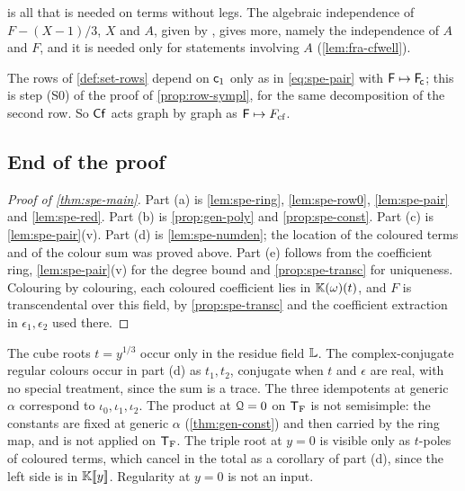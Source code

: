  is all that is needed on terms without legs. The algebraic independence of $F-(X-1)/3$, $X$ and $A$, given by \cite[Lemma~4.2]{BFGW21}, gives more, namely the independence of $A$ and $F$, and it is needed only for statements involving $A$ (\cref{lem:fra-cfwell}).

\begin{rmk}
\label{rmk:spe-cfgraph}
The rows of \cref{def:set-rows} depend on $\mathsf{c}_{1}$ only as in \eqref{eq:spe-pair} with $\mathsf{F}\mapsto\mathsf{F}_{\!\mathsf{c}}$; this is step (S0) of the proof of \cref{prop:row-sympl}, for the same decomposition of the second row. So $\mathsf{Cf}$ acts graph by graph as $\mathsf{F}\mapsto F_{\mathrm{cf}}$.
\end{rmk}

\subsection{End of the proof}

\begin{proof}[Proof of \cref{thm:spe-main}]
Part (a) is \cref{lem:spe-ring}, \cref{lem:spe-row0}, \cref{lem:spe-pair} and \cref{lem:spe-red}. Part (b) is \cref{prop:gen-poly} and \cref{prop:spe-const}. Part (c) is \cref{lem:spe-pair}(v). Part (d) is \cref{lem:spe-numden}; the location of the coloured terms and of the colour sum was proved above. Part (e) follows from the coefficient ring, \cref{lem:spe-pair}(v) for the degree bound and \cref{prop:spe-transc} for uniqueness. Colouring by colouring, each coloured coefficient lies in $\mathbb{K}(\omega)(t)$, and $F$ is transcendental over this field, by \cref{prop:spe-transc} and the coefficient extraction in $\epsilon_1,\epsilon_2$ used there.
\end{proof}

\begin{rmk}
\label{rmk:spe-rank3}
The cube roots $t=y^{1/3}$ occur only in the residue field $\mathbb{L}$. The complex-conjugate regular colours occur in part (d) as $t_1,t_2$, conjugate when $t$ and $\epsilon$ are real, with no special treatment, since the sum is a trace. The three idempotents at generic $\alpha$ correspond to $\iota_0,\iota_1,\iota_2$. The product at $\mathcal{Q}=0$ on $\mathsf{T}_{\mathrm{F}}$ is not semisimple: the constants are fixed at generic $\alpha$ (\cref{thm:gen-const}) and then carried by the ring map, and \cite{Tel12} is not applied on $\mathsf{T}_{\mathrm{F}}$. The triple root at $y=0$ is visible only as $t$-poles of coloured terms, which cancel in the total as a corollary of part (d), since the left side is in $\mathbb{K}[\![ y ]\!]$. Regularity at $y=0$ is not an input.
\end{rmk}
